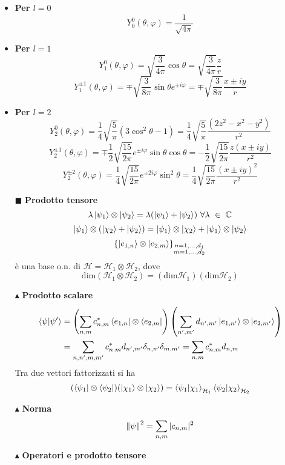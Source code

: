 \documentclass{book}
\newcommand{\g}{\textbf}
\newcommand{\e}{\begin{equation}}
\newcommand{\ex}{\end{equation} }
\renewcommand{\it}{\item[$\cdot$]}
\begin{document}
\begin{multicols}{4}
\begin{itemize}
    \it \g{Per $l = 0$}
        \e{Y^0_0(\theta, \varphi) = \frac{1}{\sqrt{4\pi}}} \ex

    \it \g{Per $l = 1$}
        \e{Y^0_1(\theta, \varphi) = \sqrt{\frac{3}{4\pi}} \cos\theta = \sqrt{\frac{3}{4\pi}} \frac{z}{r}} \ex
        \e{Y^{\pm 1}_1(\theta, \varphi) = \mp \sqrt{\frac{3}{8\pi}} \sin\theta e^{\pm i\varphi} = \mp \sqrt{\frac{3}{8\pi}} \frac{x \pm iy}{r}} \ex

    \it \g{Per $l = 2$}
        \e{Y^0_2(\theta, \varphi) = \frac{1}{4} \sqrt{\frac{5}{\pi}} (3\cos^2\theta - 1) = \frac{1}{4} \sqrt{\frac{5}{\pi}} \frac{(2z^2 - x^2 - y^2)}{r^2}} \ex
        \e{Y^{\pm 1}_2(\theta, \varphi) = \mp\frac{1}{2} \sqrt{\frac{15}{2\pi}} e^{\pm i\varphi} \sin\theta \cos\theta = -\frac{1}{2} \sqrt{\frac{15}{2\pi}} \frac{z(x \pm iy)}{r^2}} \ex
        \e{Y^{\pm 2}_2(\theta, \varphi) = \frac{1}{4} \sqrt{\frac{15}{2\pi}} e^{\pm 2i\varphi} \sin^2\theta = \frac{1}{4} \sqrt{\frac{15}{2\pi}} \frac{(x \pm iy)^2}{r^2}} \ex
        \item [$\blacksquare$] \g{Prodotto tensore}
        \e{\lambda \ket{\psi_{1}} \otimes \ket{\psi_{2}} = \lambda (\ket{\psi_{1}} + \ket{\psi_{2}}) \ \forall \lambda \ \in\  \mathbb{C}}\ex
\e{\ket{\psi_{1}} \otimes (\ket{\chi_{2}} + \ket{\psi_{2}}) = \ket{\psi_{1}} \otimes \ket{\chi_{2}} + \ket{\psi_{1}} \otimes \ket{\psi_{2}}}\ex
\e{\left\{ \ket{e_{1,n}} \otimes \ket{e_{2,m}} \right\}_{\substack{n = 1,\dots,d_1 \\ m = 1,\dots,d_2}}}\ex
è una base o.n. di $\mathcal{H} = \mathcal{H}_{1} \otimes \mathcal{H}_{2}$, dove
\e{\text{dim}(\mathcal{H}_{1} \otimes \mathcal{H}_{2}) = (\text{dim}\mathcal{H}_{1})(\text{dim}\mathcal{H}_{2})}\ex
    \item [$\blacktriangle$]\g{Prodotto scalare}
\begin{align}
    \braket{\psi}{\psi'} &= \left(\sum_{n,m}c_{n,m}^{*
}\bra{e_{1,n}}\otimes\bra{e_{2,m}}\right)\left(\sum_{n',m'}d_{n',m'}\ket{e_{1,n'}}\otimes\ket{e_{2,m'}}\right) \\
&= \sum_{n,n',m,m'}c_{n.m}^{*}d_{n',m'}\delta_{n,n'}\delta_{m.m'} = \sum_{n,m}c_{n.m}^{*}d_{n,m}
\end{align}
Tra due vettori fattorizzati si ha 
\e{(\bra{\psi_{1}}\otimes \bra{\psi_{2}})(\ket{\chi_{1}}\otimes\ket{\chi_{2}}) = \braket{\psi_{1}}{\chi_{1}}_{\mathcal{H}_{1}}\braket{\psi_{2}}{\chi_{2}}_{\mathcal{H}_{2}}}\ex
     \item [$\blacktriangle$]\g{Norma}
\e{\norm{\psi}^{2} = \sum_{n,m}|c_{n,m}|^{2}}\ex
\item [$\blacktriangle$] \g{Operatori e prodotto tensore}

\end{itemize}
\end{multicols}
\end{document}
